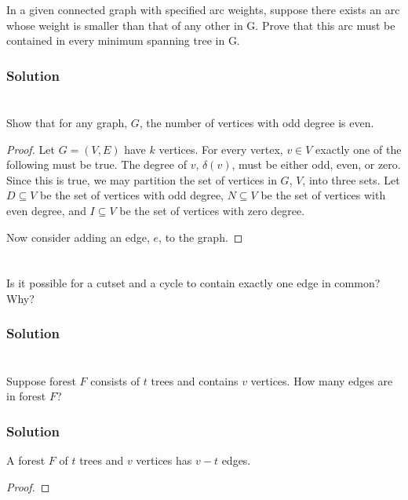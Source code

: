 \documentclass{amsart}
\begin{document}
\section{}
In a given connected graph with specified arc weights, suppose there exists an arc whose
weight is smaller than that of any other in G. Prove that this arc must be contained in every
minimum spanning tree in G.
\subsubsection*{Solution}

\section{}
Show that for any graph, $G$, the number of vertices with odd degree is even.
\begin{proof}
  Let $G=(V,E)$ have $k$ vertices. For every vertex, $v\in V$ exactly one of the
  following must be true.
  The degree of $v$, $\delta(v)$, must be either odd, even, or zero.
  Since this is true, we may partition the set of vertices in $G$, $V$, into
  three sets.
  Let $D\subseteq V$ be the set of vertices with odd degree,
  $N\subseteq V$ be the set of vertices with even degree,
  and $I\subseteq V$ be the set of vertices with zero degree.

  Now consider adding an edge, $e$, to the graph.
\end{proof}

\section{}
Is it possible for a cutset and a cycle to contain exactly one edge in common? Why?
\subsubsection*{Solution}

\section{}
Suppose forest $F$ consists of $t$ trees and contains $v$ vertices. How many
edges are in forest $F$?

\subsubsection*{Solution}

A forest $F$ of $t$ trees and $v$ vertices has $v-t$ edges.
\begin{proof}
\end{proof}
\end{document}

